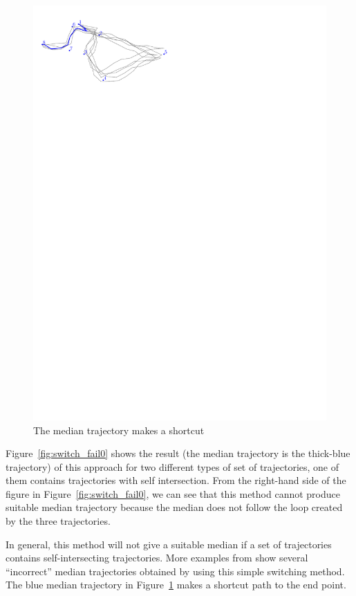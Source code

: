 \begin{figure}
\centering
\includegraphics[scale=1]{Gambar/switch_fail1}
\caption[The median trajectory make a shortcut path \cite{Lionov:2009}]{The median trajectory makes a shortcut \cite{Lionov:2009}} 
\label{fig:switch_fail1}
\end{figure} 

Figure~\ref{fig:switch_fail0} shows the result (the median trajectory is the thick-blue trajectory) of this approach for two different types of set of trajectories, one of them contains trajectories with self intersection.
From the right-hand side of the figure in Figure~\ref{fig:switch_fail0}, we can see that this method cannot produce suitable median trajectory because the median does not follow the loop created by the three trajectories.

In general, this method will not give a suitable median if a set of trajectories contains self-intersecting trajectories.
More examples from \cite{Lionov:2009} show several ``incorrect'' median trajectories obtained by using this simple switching method.
The blue median trajectory in Figure~\ref{fig:switch_fail1} makes a shortcut path to the end point.

